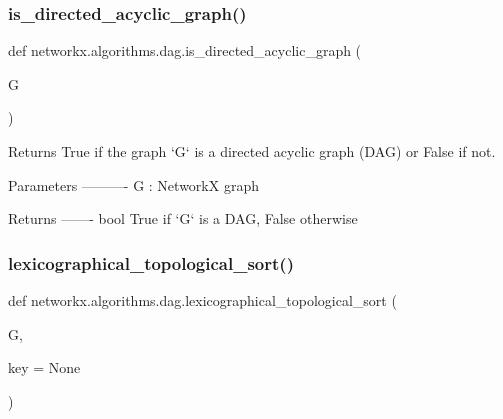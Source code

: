 \subsubsection{\texorpdfstring{is\+\_\+directed\+\_\+acyclic\+\_\+graph()}{is\_directed\_acyclic\_graph()}}
{\footnotesize\ttfamily def networkx.\+algorithms.\+dag.\+is\+\_\+directed\+\_\+acyclic\+\_\+graph (\begin{DoxyParamCaption}\item[{}]{G }\end{DoxyParamCaption})}

\begin{DoxyVerb}Returns True if the graph `G` is a directed acyclic graph (DAG) or
False if not.

Parameters
----------
G : NetworkX graph

Returns
-------
bool
    True if `G` is a DAG, False otherwise
\end{DoxyVerb}
 \mbox{\label{namespacenetworkx_1_1algorithms_1_1dag_a718a056e7a26627ee5bd12d1db32e0be}} 
\subsubsection{\texorpdfstring{lexicographical\+\_\+topological\+\_\+sort()}{lexicographical\_topological\_sort()}}
{\footnotesize\ttfamily def networkx.\+algorithms.\+dag.\+lexicographical\+\_\+topological\+\_\+sort (\begin{DoxyParamCaption}\item[{}]{G,  }\item[{}]{key = {\ttfamily None} }\end{DoxyParamCaption})}

